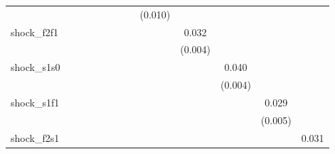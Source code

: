 {\begin{tabular}{l*{12}{c}}
            &                     &                     &                     &                     &                     &                     &                     &     (0.010)         &                     &                     &                     &                     \\
\addlinespace
shock\_f2f1  &                     &                     &                     &                     &                     &                     &                     &                     &       0.032\sym{***}&                     &                     &                     \\
            &                     &                     &                     &                     &                     &                     &                     &                     &     (0.004)         &                     &                     &                     \\
\addlinespace
shock\_s1s0  &                     &                     &                     &                     &                     &                     &                     &                     &                     &       0.040\sym{***}&                     &                     \\
            &                     &                     &                     &                     &                     &                     &                     &                     &                     &     (0.004)         &                     &                     \\
\addlinespace
shock\_s1f1  &                     &                     &                     &                     &                     &                     &                     &                     &                     &                     &       0.029\sym{***}&                     \\
            &                     &                     &                     &                     &                     &                     &                     &                     &                     &                     &     (0.005)         &                     \\
\addlinespace
shock\_f2s1  &                     &                     &                     &                     &                     &                     &                     &                     &                     &                     &                     &       0.031\sym{***}\\

\end{tabular}}
